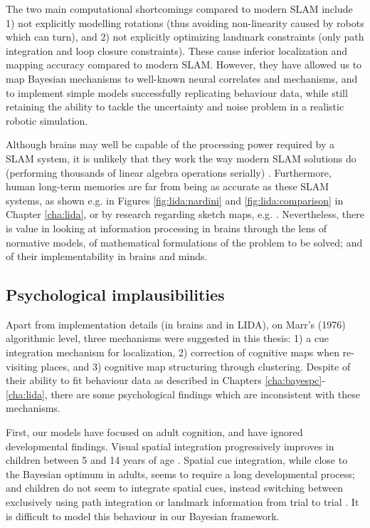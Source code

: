 The two main computational shortcomings compared to modern SLAM include 1) not explicitly modelling rotations (thus avoiding non-linearity caused by robots which can turn), and 2) not explicitly optimizing landmark constraints (only path integration and loop closure constraints). These cause inferior localization and mapping accuracy compared to modern SLAM. However, they have allowed us to map Bayesian mechanisms to well-known neural correlates and mechanisms, and to implement simple models successfully replicating behaviour data, while still retaining the ability to tackle the uncertainty and noise problem in a realistic robotic simulation.

Although brains may well be capable of the processing power required by a SLAM system, it is unlikely that they work the way modern SLAM solutions do (performing thousands of linear algebra operations serially) \citep{thrun2008simultaneous}. Furthermore, human long-term memories are far from being as accurate as these SLAM systems, as shown e.g. in Figures \ref{fig:lida:nardini} and \ref{fig:lida:comparison} in Chapter \ref{cha:lida}, or by research regarding sketch maps, e.g. \citep{rovine1989sketch, wang2009accuracy}. Nevertheless, there is value in looking at information processing in brains through the lens of normative models, of mathematical formulations of the problem to be solved; and of their implementability in brains and minds. 

\subsection{Psychological implausibilities}

Apart from implementation details (in brains and in LIDA), on Marr's (1976) algorithmic level, three mechanisms were suggested in this thesis: 1) a cue integration mechanism for localization, 2) correction of cognitive maps when re-visiting places, and 3) cognitive map structuring through clustering. Despite of their ability to fit behaviour data as described in Chapters \ref{cha:bayespc}-\ref{cha:lida}, there are some psychological findings which are inconsistent with these mechanisms. 

First, our models have focused on adult cognition, and have ignored developmental findings. Visual spatial integration progressively improves in children between 5 and 14 years of age \citep{kovacs1999late}. Spatial cue integration, while close to the Bayesian optimum in adults, seems to require a long developmental process; and children do not seem to integrate spatial cues, instead switching between exclusively using path integration or landmark information from trial to trial \citep{nardini2008development}. It is difficult to model this behaviour in our Bayesian framework.

